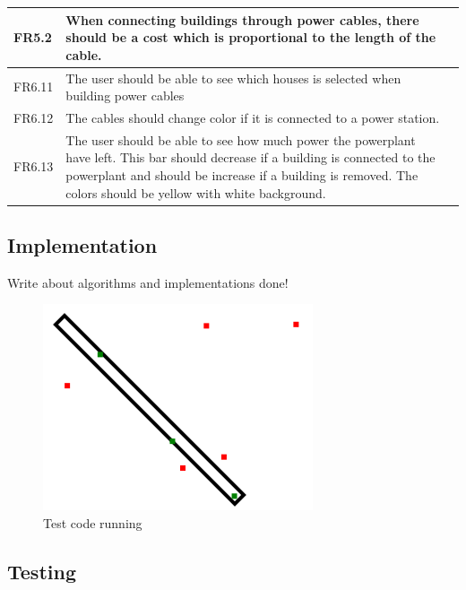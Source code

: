 \begin{tabular}{| p{1.2cm} | p{8cm} | p{3cm} |}
		FR5.2 & When connecting buildings through power cables, there should be a 
		cost which is proportional to the length of the cable. & \\ \hline

		FR6.11 & The user should be able to see which houses is selected when 
		building power cables & \\ \hline

		FR6.12 & The cables should change color if it is connected to a power 
		station. & \\ \hline

		FR6.13 & The user should be able to see how much power the powerplant have 
		left. This bar should decrease if a building is connected to the powerplant 
		and should be increase if a building is removed. The colors should be yellow 
		with white background. & \\ \hline

	\end{tabular}

\subsection{Implementation}

	Write about algorithms and implementations done!
	
	\begin{figure}[H]
		\includegraphics[scale=0.6]{pictures/touchInStroke.png}
		\caption{Test code running}
	\end{figure}

\subsection{Testing}


